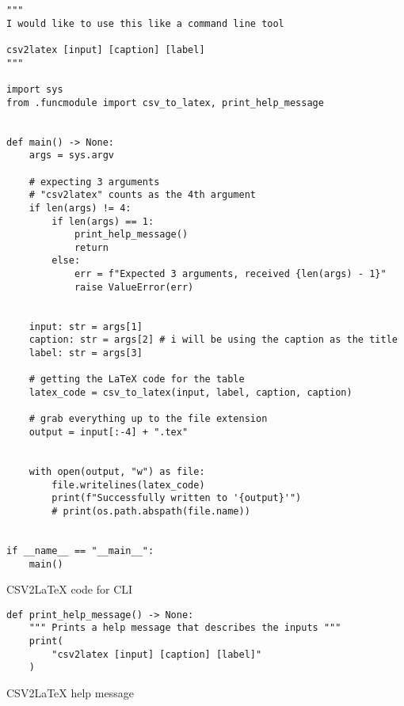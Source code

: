 \newpage
\begin{listing}[!h]
    \begin{verbatim}
""" 
I would like to use this like a command line tool

csv2latex [input] [caption] [label]
"""

import sys
from .funcmodule import csv_to_latex, print_help_message


def main() -> None:
    args = sys.argv

    # expecting 3 arguments    
    # "csv2latex" counts as the 4th argument
    if len(args) != 4:
        if len(args) == 1:
            print_help_message()
            return
        else:
            err = f"Expected 3 arguments, received {len(args) - 1}"
            raise ValueError(err)


    input: str = args[1]
    caption: str = args[2] # i will be using the caption as the title
    label: str = args[3]

    # getting the LaTeX code for the table
    latex_code = csv_to_latex(input, label, caption, caption)

    # grab everything up to the file extension
    output = input[:-4] + ".tex"
    
    
    with open(output, "w") as file:
        file.writelines(latex_code)
        print(f"Successfully written to '{output}'")
        # print(os.path.abspath(file.name))

            
if __name__ == "__main__":
    main()
    \end{verbatim}
    \caption{CSV2LaTeX code for CLI}
    \label{sc:csv2latex-cli}
\end{listing}

\newpage
\begin{listing}[!h]
    \begin{verbatim}
def print_help_message() -> None:
    """ Prints a help message that describes the inputs """
    print(
        "csv2latex [input] [caption] [label]"
    )
    \end{verbatim}
    \caption{CSV2LaTeX help message}
    \label{sc:csv2latex-help-msg}
\end{listing}



